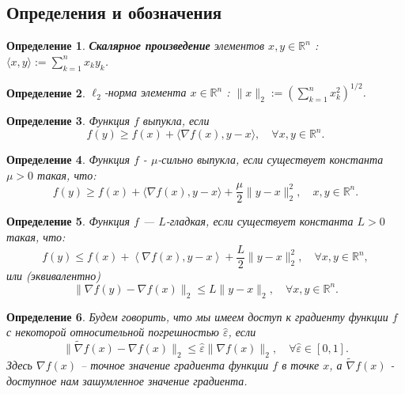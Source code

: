 \documentclass{article}
\newcommand{\R}{\mathbb{R}}
\newtheorem{Def}{Определение}[section]
\begin{document}
\subsection{\textbf{Определения и обозначения}}


\begin{Def}
\textbf{Скалярное произведение} элементов $x,y \in \R^n$ : $\langle x,y \rangle := \sum\limits_{k=1}^n x_ky_k$.
\end{Def}

\begin{Def}
$\ell_2$-норма элемента $x \in \R^n$ : $\|x\|_2 := \left(\sum\limits_{k=1}^n x_k^2\right)^{1/2}$.
\end{Def}

\begin{Def}
Функция $f$ выпукла, если 
\begin{equation}
    f(y) \geq f(x)+\langle\nabla f(x), y-x\rangle, \quad \forall x, y \in \mathbb{R}^n.
\end{equation}
\end{Def}

\begin{Def}
Функция $f$ - $\mu$-сильно выпукла, если существует константа $\mu > 0$ такая, что:
    \begin{equation}\label{eq:str_cvx}
        f(y) \geq f(x) + \langle \nabla f(x), y - x \rangle + \frac{\mu}{2}\|y - x\|_2^2, \quad x, y \in \R^n. 
    \end{equation}
\end{Def}

\begin{Def}
Функция $f$ --- $L$-гладкая, если существует константа $L > 0$ такая, что:
\begin{equation}\label{smoothness_cond}
    f(y) \leq f(x)+ \left\langle\nabla f(x), y-x\right\rangle + \frac{L}{2} \|y-x\|_2^2, \quad \forall x, y \in \mathbb{R}^n,
\end{equation}
или (эквивалентно) 
\begin{equation}\label{eq_6}
    \|\nabla f(y) - \nabla f(x)\|_2 \leq L \|y - x\|_2, \quad \forall x, y \in \mathbb{R}^n.
\end{equation}
\end{Def}

\begin{Def}
Будем говорить, что мы имеем доступ к градиенту функции $f$ с некоторой относительной погрешностью $\hat{\varepsilon}$, если
\begin{equation}\label{eq_relative_error}
    \|\widetilde{\nabla} f(x) - \nabla f(x)\|_2 \leq \hat{\varepsilon} \|\nabla f(x)\|_2, \quad \forall \hat{\varepsilon} \in [0, 1].
\end{equation}
Здесь $\nabla f(x)$ -- точное значение градиента функции $f$ в точке $x$, а $\widetilde{\nabla} f(x)$ - доступное нам зашумленное значение градиента.
\end{Def}
\end{document}
